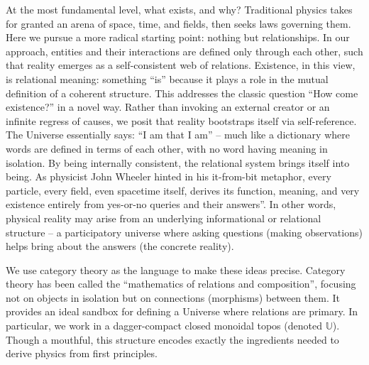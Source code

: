 \documentclass{article}
\begin{document}
At the most fundamental level, what exists, and why? Traditional physics takes for granted an arena of space, time, and fields, then seeks laws governing them. Here we pursue a more radical starting point: nothing but relationships. In our approach, entities and their interactions are defined only through each other, such that reality emerges as a self-consistent web of relations. Existence, in this view, is relational meaning: something ``is'' because it plays a role in the mutual definition of a coherent structure. This addresses the classic question ``How come existence?'' in a novel way. Rather than invoking an external creator or an infinite regress of causes, we posit that reality bootstraps itself via self-reference. The Universe essentially says: ``I am that I am'' -- much like a dictionary where words are defined in terms of each other, with no word having meaning in isolation. By being internally consistent, the relational system brings itself into being. As physicist John Wheeler hinted in his it-from-bit metaphor, every particle, every field, even spacetime itself, derives its function, meaning, and very existence entirely from yes-or-no queries and their answers''\cite{wheeler1989}. In other words, physical reality may arise from an underlying informational or relational structure -- a participatory universe where asking questions (making observations) helps bring about the answers (the concrete reality)\cite{wheeler1989}.

We use category theory as the language to make these ideas precise. Category theory has been called the ``mathematics of relations and composition''\cite{awodey2010}, focusing not on objects in isolation but on connections (morphisms) between them. It provides an ideal sandbox for defining a Universe where relations are primary. In particular, we work in a dagger-compact closed monoidal topos (denoted $\mathbb{U}$). Though a mouthful, this structure encodes exactly the ingredients needed to derive physics from first principles.
\end{document}
